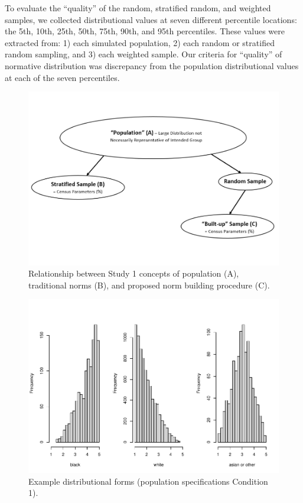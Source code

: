 \documentclass[
  ,man]{apa6}
\begin{document}
To evaluate the ``quality'' of the random, stratified random, and weighted samples, we collected distributional values at seven different percentile locations: the 5th, 10th, 25th, 50th, 75th, 90th, and 95th percentiles. These values were extracted from: 1) each simulated population, 2) each random or stratified random sampling, and 3) each weighted sample. Our criteria for ``quality'' of normative distribution was discrepancy from the population distributional values at each of the seven percentiles.

\begin{figure}
\centering
\includegraphics{NormsBuilding_files/figure-latex/Figure1-1.pdf}
\caption{\label{fig:Figure1}Relationship between Study 1 concepts of population (A), traditional norms (B), and proposed norm building procedure (C).}
\end{figure}

\begin{figure}
\centering
\includegraphics{NormsBuilding_files/figure-latex/Figure2-1.pdf}
\caption{\label{fig:Figure2}Example distributional forms (population specifications Condition 1).}
\end{figure}
\end{document}
